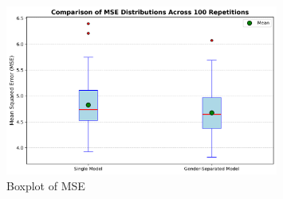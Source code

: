\documentclass[12pt,a4paper]{article}
\begin{document}
\begin{figure}[htbp]
    \centering
    \includegraphics[width=0.8\textwidth]{./fig/MSE_comparison_boxplot.png}
    \caption{Boxplot of MSE}
    \label{fig:boxplot_mse}
\end{figure}
\end{document}
